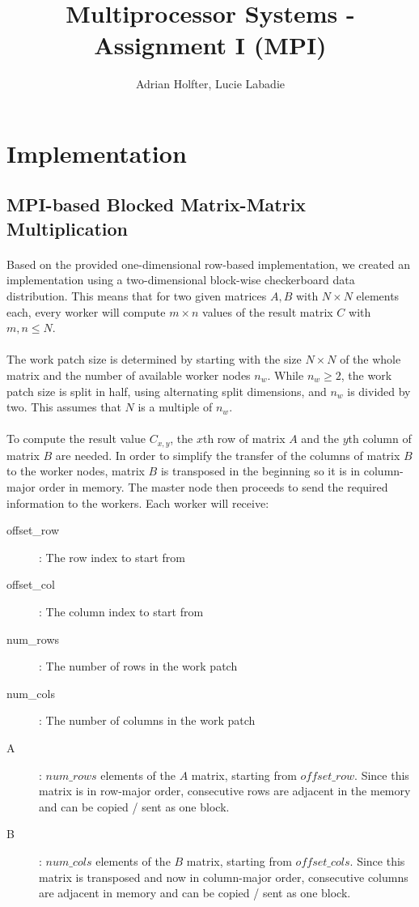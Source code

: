 \documentclass[]{article}
\title{Multiprocessor Systems - Assignment I (MPI)}
\author{Adrian Holfter, Lucie Labadie}
\begin{document}
\maketitle

\section{Implementation}

\subsection{MPI-based Blocked Matrix-Matrix Multiplication}

\paragraph{} Based on the provided one-dimensional row-based implementation, we created an implementation using a two-dimensional block-wise checkerboard data distribution. This means that for two given matrices $A,B$ with $N \times N$ elements each, every worker will compute $m \times n$ values of the result matrix $C$ with $m,n \leq N$.

\paragraph{} The work patch size is determined by starting with the size $N \times N$ of the whole matrix and the number of available worker nodes $n_w$. While $n_w \geq 2$, the work patch size is split in half, using alternating split dimensions, and $n_w$ is divided by two. This assumes that $N$ is a multiple of $n_w$.

\paragraph{}
To compute the result value $C_{x,y}$, the $x$th row of matrix $A$ and the $y$th column of matrix $B$ are needed.
In order to simplify the transfer of the columns of matrix $B$ to the worker nodes, matrix $B$ is transposed in the beginning so it is in column-major order in memory.
The master node then proceeds to send the required information to the workers. Each worker will receive:
\begin{description}
	\item[offset\_row]: The row index to start from
	\item[offset\_col]: The column index to start from
	\item[num\_rows]: The number of rows in the work patch
	\item[num\_cols]: The number of columns in the work patch
	\item[A]: $num\_rows$ elements of the $A$ matrix, starting from $offset\_row$. Since this matrix is in row-major order, consecutive rows are adjacent in the memory and can be copied / sent as one block.
	\item[B]: $num\_cols$ elements of the $B$ matrix, starting from $offset\_cols$. Since this matrix is transposed and now in column-major order, consecutive columns are adjacent in memory and can be copied / sent as one block.
\end{description}
\end{document}
